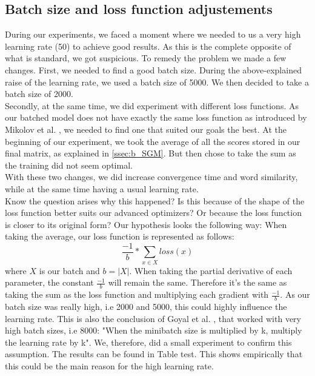 \subsection{Batch size and loss function adjustements}\label{ssec:bs_lf}
During our experiments, we faced a moment where we needed to us a very high learning rate (50) to achieve good results. As this is the complete opposite of what is standard, we got suspicious. To remedy the problem we made a few changes. 
First, we needed to find a good batch size. During the above-explained raise of the learning rate, we used a batch size of 5000. We then decided to take a batch size of 2000.\\
 Secondly, at the same time, we did experiment with different loss functions. As our batched model does not have exactly the same loss function as introduced by Mikolov et al. \cite{mikolov}, we needed to find one that suited our goals the best. At the beginning of our experiment, we took the average of all the scores stored in our final matrix, as explained in \ref{ssec:b_SGM}. But then chose to take the sum as the training did not seem optimal.\\ 
 With these two changes, we did increase convergence time and word similarity, while at the same time having a usual learning rate. \\
 Know the question arises why this happened? Is this because of the shape of the loss function better suits our advanced optimizers? Or because the loss function is closer to its original form? Our hypothesis looks the following way: 
 When taking the average, our loss function is represented as follows:
 \begin{equation}
 \frac{-1}{b }* \sum_{x\in X} loss(x)
 \end{equation}
where $X$ is our batch and $b = |X|$. 
When taking the partial derivative of each parameter, the constant $ \frac{-1}{b }$ will remain the same. Therefore it's the same as taking the sum as the loss function and multiplying each gradient with $\frac{-1}{b }$. As our batch size was really high, i.e 2000 and 5000, this could highly influence the learning rate. This is also the conclusion of Goyal et al. \cite{fb}, that worked with very high batch sizes, i.e 8000: "When the minibatch size is multiplied by k, multiply the learning rate by k". We, therefore, did a small experiment to confirm this assumption. The results can be found in Table test. This shows empirically that this could be the main reason for the high learning rate.

